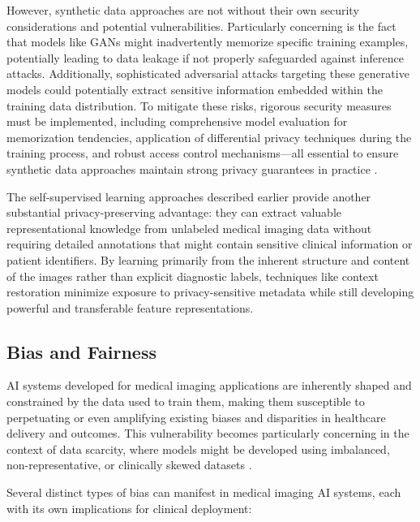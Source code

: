 \documentclass{article}
\begin{document}
However, synthetic data approaches are not without their own security considerations and potential vulnerabilities. Particularly concerning is the fact that models like GANs might inadvertently memorize specific training examples, potentially leading to data leakage if not properly safeguarded against inference attacks. Additionally, sophisticated adversarial attacks targeting these generative models could potentially extract sensitive information embedded within the training data distribution. To mitigate these risks, rigorous security measures must be implemented, including comprehensive model evaluation for memorization tendencies, application of differential privacy techniques during the training process, and robust access control mechanisms—all essential to ensure synthetic data approaches maintain strong privacy guarantees in practice \cite{koetzierGeneratingSyntheticData2024}.

The self-supervised learning approaches described earlier provide another substantial privacy-preserving advantage: they can extract valuable representational knowledge from unlabeled medical imaging data without requiring detailed annotations that might contain sensitive clinical information or patient identifiers. By learning primarily from the inherent structure and content of the images rather than explicit diagnostic labels, techniques like context restoration minimize exposure to privacy-sensitive metadata while still developing powerful and transferable feature representations.

\subsection{Bias and Fairness}
AI systems developed for medical imaging applications are inherently shaped and constrained by the data used to train them, making them susceptible to perpetuating or even amplifying existing biases and disparities in healthcare delivery and outcomes. This vulnerability becomes particularly concerning in the context of data scarcity, where models might be developed using imbalanced, non-representative, or clinically skewed datasets \cite{koetzierGeneratingSyntheticData2024}.

Several distinct types of bias can manifest in medical imaging AI systems, each with its own implications for clinical deployment:
\end{document}
